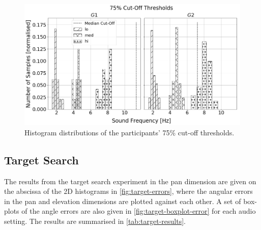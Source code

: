\documentclass{article}
\begin{document}
\begin{figure}
  \centering
  \includegraphics[width=1.0\textwidth]{figures/pitch_thresholds_limits.png}
  \caption{Histogram distributions of the participants' 75\% cut-off thresholds. }\label{fig:pitch-thresholds-hist}
\end{figure}

\subsection{Target Search}

The results from the target search experiment in the pan dimension are given on the abscissa of the 2D histograms in \cref{fig:target-errors}, where the angular errors in the pan and elevation dimensions are plotted against each other. 
A set of box-plots of the angle errors are also given in \cref{fig:target-boxplot-error} for each audio setting.
The results are summarised in \cref{tab:target-results}.
\end{document}
